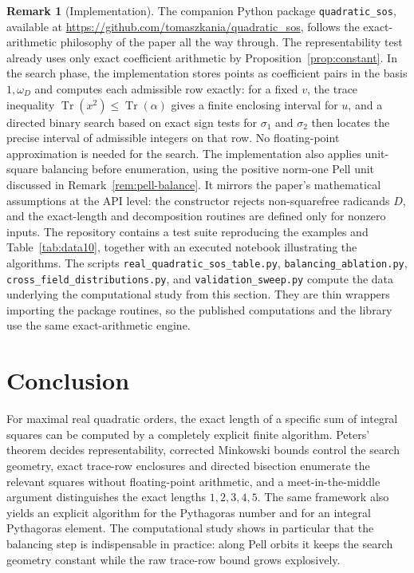 \documentclass[manuscript,screen]{acmart}
\renewcommand{\le}{\leqslant}
\theoremstyle{plain}
\theoremstyle{definition}
\theoremstyle{nonitalicremark}
\newtheorem{remark}[theorem]{Remark}
\newcommand{\wD}{\omega_D}
\newcommand{\sig}{\sigma}
\newcommand{\Tr}{\operatorname{Tr}}
\begin{document}
\begin{remark}[Implementation]
The companion Python package \texttt{quadratic\_sos}, available at
\url{https://github.com/tomaszkania/quadratic_sos}, follows the exact-arithmetic philosophy of the
paper all the way through. The representability test already uses only exact coefficient
arithmetic by Proposition~\ref{prop:constant}. In the search phase, the implementation stores
points as coefficient pairs in the basis $1,\wD$ and computes each admissible row exactly: for a
fixed $v$, the trace inequality $\Tr(x^2)\le \Tr(\alpha)$ gives a finite enclosing interval for
$u$, and a directed binary search based on exact sign tests for $\sig_1$ and $\sig_2$ then locates
the precise interval of admissible integers on that row. No floating-point approximation is needed
for the search. The implementation also applies unit-square balancing before enumeration, using the
positive norm-one Pell unit discussed in Remark~\ref{rem:pell-balance}. It mirrors the paper's
mathematical assumptions at the API level: the constructor rejects non-squarefree radicands $D$,
and the exact-length and decomposition routines are defined only for nonzero inputs. The
repository contains a test suite reproducing the examples and Table~\ref{tab:data10}, together
with an executed notebook illustrating the algorithms. The scripts
\texttt{real\_quadratic\_sos\_table.py}, \texttt{balancing\_ablation.py},
\texttt{cross\_field\_distributions.py}, and \texttt{validation\_sweep.py}
compute the data underlying the computational study from this section. They are thin wrappers
importing the package routines, so the published computations and the library use the same
exact-arithmetic engine.
\end{remark}

\section*{Conclusion}

For maximal real quadratic orders, the exact length of a specific sum of integral squares can be
computed by a completely explicit finite algorithm. Peters' theorem decides representability,
corrected Minkowski bounds control the search geometry, exact trace-row enclosures and directed
bisection enumerate the relevant squares without floating-point arithmetic, and a
meet-in-the-middle argument distinguishes the exact lengths $1,2,3,4,5$.
The same framework also yields an explicit algorithm for the Pythagoras number and for an
integral Pythagoras element. The computational study shows in particular that the balancing step
is indispensable in practice: along Pell orbits it keeps the search geometry constant while the raw
trace-row bound grows explosively.
\end{document}
